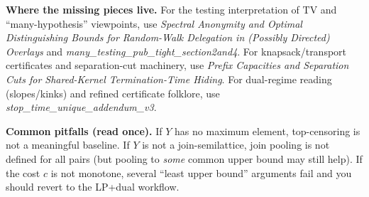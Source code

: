 \documentclass[11pt]{article}
\theoremstyle{definition}
\theoremstyle{remark}
\newcommand{\TV}{\mathrm{TV}}
\begin{document}
\vspace{0.25em}\noindent
\textbf{Where the missing pieces live.}
For the testing interpretation of $\TV$ and ``many-hypothesis'' viewpoints, use \emph{Spectral Anonymity and Optimal Distinguishing Bounds for Random-Walk Delegation in (Possibly Directed) Overlays} and \emph{many\_testing\_pub\_tight\_section2and4}.
For knapsack/transport certificates and separation-cut machinery, use \emph{Prefix Capacities and Separation Cuts for Shared-Kernel Termination-Time Hiding}.
For dual-regime reading (slopes/kinks) and refined certificate folklore, use \emph{stop\_time\_unique\_addendum\_v3}.





\vspace{0.25em}\noindent
\textbf{Common pitfalls (read once).}
If $Y$ has no maximum element, top-censoring is not a meaningful baseline. If $Y$ is not a join-semilattice, join pooling is not defined for all pairs (but pooling to \emph{some} common upper bound may still help). If the cost $c$ is not monotone, several ``least upper bound'' arguments fail and you should revert to the LP+dual workflow.
\end{document}
